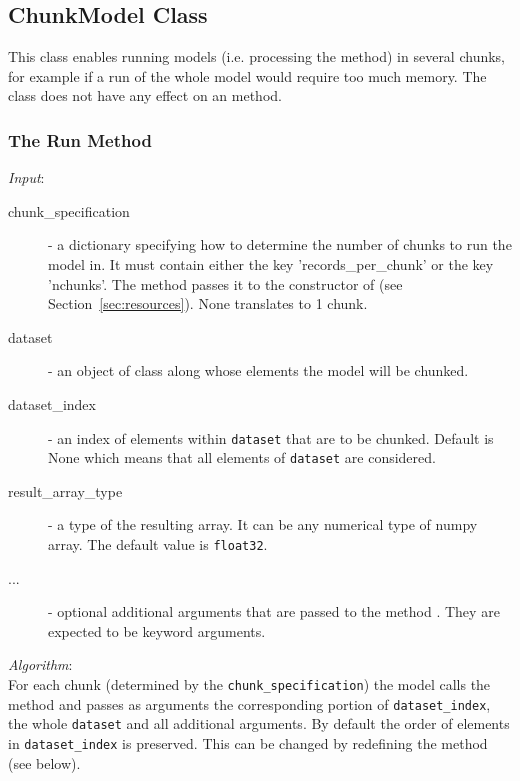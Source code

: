 {\subsection{ChunkModel Class}
\label{sec:chunk-model} 

This class enables running models (i.e. processing the  method) in
several chunks, for example if a run of the whole model would require too much
memory. The class does not have any effect on an  method.

\subsubsection{The Run Method}
{\it Input}:
\begin{description}
\item[chunk_specification] - a dictionary specifying how to determine the number
  of chunks to run the model in. It must contain either the key 'records_per_chunk'
  or the key 'nchunks'. The method passes it to the constructor of  
  (see Section~\ref{sec:resources}). None translates to 1 chunk. 
\item[dataset] - an object of class  along whose elements the
  model will be chunked.
\item[dataset_index] - an index of elements within \verb|dataset| that are to
  be chunked. Default is None which means that all elements of \verb|dataset| are considered.
\item[result_array_type] - a type of the resulting array. It can be any numerical type of numpy array. \numpyindex
        The default value is \verb|float32|.
\item[...] - optional additional arguments that are passed to the method
  . They are expected to be keyword arguments.
\end{description}


{\it Algorithm}:~\\[1mm]
%
For each chunk (determined by the \verb|chunk_specification|) the model calls
the method  and passes as arguments the corresponding portion
of \verb|dataset_index|, \datasetindex the whole \verb|dataset| \datasetindex and all additional
arguments. By default the order of elements in \verb|dataset_index| is
preserved. This can be changed by redefining the method
 (see below). 

}

